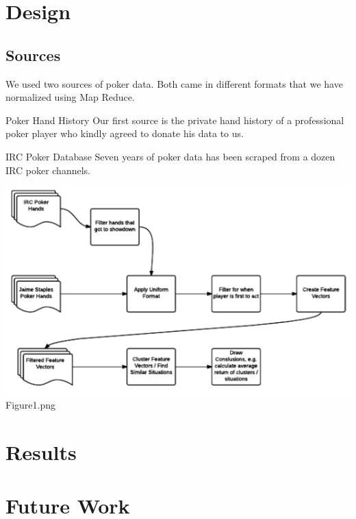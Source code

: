 \documentclass[twoside]{article}
\begin{document}
\begin{multicols}{2}

\section{Design}


\subsection{Sources}
We used two sources of poker data. Both came in different formats that we have normalized using Map Reduce. 
\begin{compactitem}
\item{Poker Hand History} Our first source is the private hand history of a professional poker player who kindly agreed to donate his data to us. 
\item{IRC Poker Database} Seven years of poker data has been scraped from a dozen IRC poker channels. 
\end{compactitem}

\includegraphics[scale=.5]{Flowchart.png}
Figure1.png



\section{Results}


\section{Future Work}



\end{multicols}
\end{document}

